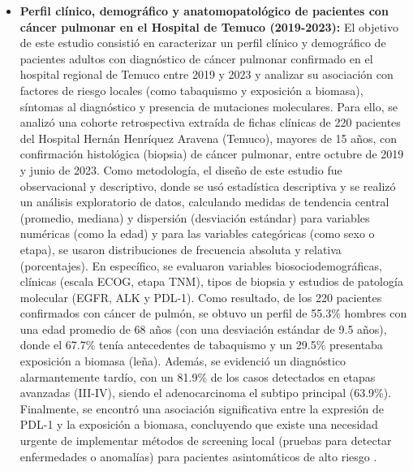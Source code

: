 \begin{itemize}
    \item \textbf{Perfil clínico, demográfico y anatomopatológico de pacientes con cáncer pulmonar en el Hospital de Temuco (2019-2023):} El objetivo de este estudio consistió en caracterizar un perfil clínico y demográfico de pacientes adultos con diagnóstico de cáncer pulmonar confirmado en el hospital regional de Temuco entre 2019 y 2023 y analizar su asociación con factores de riesgo locales (como tabaquismo y exposición a biomasa), síntomas al diagnóstico y presencia de mutaciones moleculares. Para ello, se analizó una cohorte retrospectiva extraída de fichas clínicas de 220 pacientes del Hospital Hernán Henríquez Aravena (Temuco), mayores de 15 años, con confirmación histológica (biopsia) de cáncer pulmonar, entre octubre de 2019 y junio de 2023. Como metodología, el diseño de este estudio fue observacional y descriptivo, donde se usó estadística descriptiva y se realizó un análisis exploratorio de datos, calculando medidas de tendencia central (promedio, mediana) y dispersión (desviación estándar) para variables numéricas (como la edad) y para las variables categóricas (como sexo o etapa), se usaron distribuciones de frecuencia absoluta y relativa (porcentajes). En específico, se evaluaron variables biosociodemográficas, clínicas (escala ECOG, etapa TNM), tipos de biopsia y estudios de patología molecular (EGFR, ALK y PDL-1). Como resultado, de los 220 pacientes confirmados con cáncer de pulmón, se obtuvo un perfil de 55.3\% hombres con una edad promedio de 68 años (con una desviación estándar de 9.5 años), donde el 67.7\% tenía antecedentes de tabaquismo y un 29.5\% presentaba exposición a biomasa (leña). Además, se evidenció un diagnóstico alarmantemente tardío, con un 81.9\% de los casos detectados en etapas avanzadas (III-IV), siendo el adenocarcinoma el subtipo principal (63.9\%). Finalmente, se encontró una asociación significativa entre la expresión de PDL-1 y la exposición a biomasa, concluyendo que existe una necesidad urgente de implementar métodos de screening local (pruebas para detectar enfermedades o anomalías) para pacientes asintomáticos de alto riesgo \cite{scielo1}.

\end{itemize}
